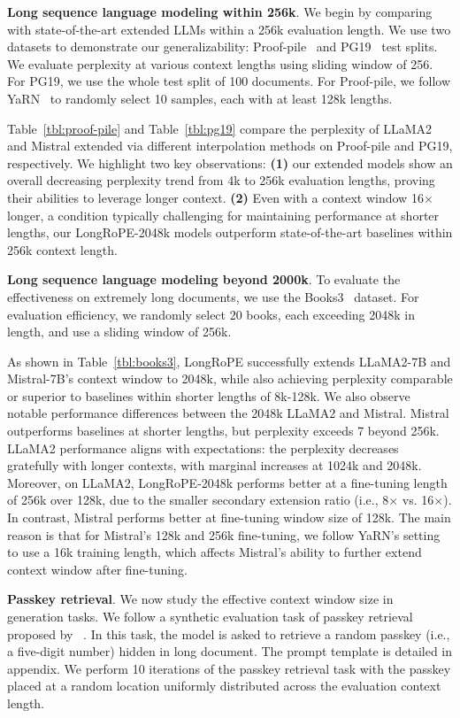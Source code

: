 \label{sec:mainresult}
\textbf{Long sequence language modeling within 256k}. We begin by comparing  with state-of-the-art extended LLMs within a 256k evaluation length. We use two datasets to demonstrate our generalizability: Proof-pile~\cite{pg19} and PG19~\cite{pile} test splits. We evaluate perplexity at various context lengths using  sliding window of 256. For PG19, we use the whole test split of 100 documents. For Proof-pile, we follow YaRN~\cite{yarn} to randomly select 10 samples, each with at  least 128k lengths. 

Table~\ref{tbl:proof-pile} and Table~\ref{tbl:pg19} compare the perplexity of LLaMA2 and Mistral extended via different interpolation methods on Proof-pile and PG19, respectively. We highlight two key observations: \textbf{(1)} our extended models show an overall decreasing perplexity trend   from 4k to 256k evaluation lengths, proving their abilities to leverage longer context. \textbf{(2)} Even with a context window 16$\times$ longer, a condition typically challenging for maintaining performance at shorter lengths, our LongRoPE-2048k models outperform state-of-the-art baselines within 256k context length.

\textbf{Long sequence language modeling beyond 2000k}. To evaluate the effectiveness on extremely long documents, we use the Books3~\cite{pile} dataset. For evaluation efficiency, we randomly select 20 books, each  exceeding 2048k in length, and use a sliding window of 256k. 

As shown in Table~\ref{tbl:books3}, LongRoPE successfully extends LLaMA2-7B and Mistral-7B's context window to 2048k, while also achieving perplexity comparable or superior to baselines within shorter lengths of 8k-128k. We also observe notable performance differences between the 2048k LLaMA2 and Mistral.  Mistral outperforms baselines at shorter lengths, but perplexity exceeds 7 beyond 256k. LLaMA2 performance aligns with expectations: the perplexity decreases gratefully with longer contexts, with marginal increases at 1024k and 2048k. Moreover, on LLaMA2, LongRoPE-2048k performs better at a fine-tuning length of 256k over 128k, due to the smaller secondary extension ratio (i.e., 8$\times$ vs. 16$\times$). In contrast, Mistral performs better at fine-tuning window size of 128k.  The main reason is that for Mistral's 128k and 256k fine-tuning, we follow YaRN's setting to use a 16k training length, which affects Mistral's ability to further extend context window after fine-tuning.  

\textbf{Passkey retrieval}. We now study the effective context window size in generation tasks. We follow a synthetic evaluation task of passkey retrieval proposed by ~\cite{passkey}. In this task, the model is asked to retrieve a random passkey (i.e., a five-digit number) hidden in long document. The prompt template is detailed in appendix. We perform 10 iterations of the passkey retrieval task with the passkey placed at a random location uniformly distributed across the evaluation context length.

